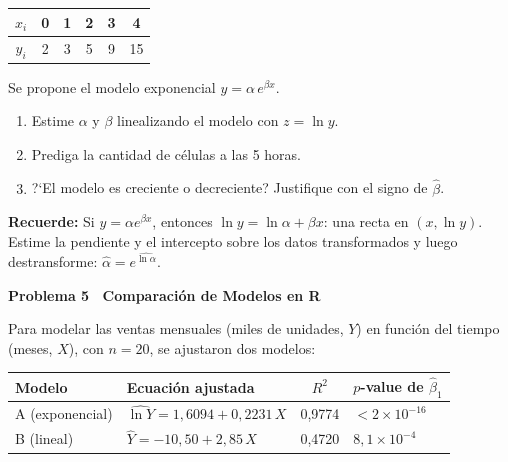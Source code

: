 \documentclass[10pt,letterpaper]{article}
\newcommand{\seccion}[1]{%
  \vspace{2pt}%
  \begin{tcolorbox}[enhanced,colback=white,colframe=black,arc=0pt,boxrule=0pt,
    leftrule=2pt,left=6pt,right=6pt,top=1pt,bottom=1pt]
    {\normalsize\bfseries\sffamily #1}
  \end{tcolorbox}%
  \vspace{1pt}%
}
\newcommand{\reglacaja}[1]{%
  \begin{tcolorbox}[enhanced,colback=white,colframe=black,arc=0pt,boxrule=0.5pt,
    left=6pt,right=6pt,top=2pt,bottom=2pt,breakable]
  \small\sffamily #1
  \end{tcolorbox}%
}
\begin{document}
\vspace{4pt}
\begin{center}
\small\sffamily
\begin{tabular}{|c|c|c|c|c|c|}
\hline
$x_i$ & 0 & 1 & 2 & 3 & 4 \\
\hline
$y_i$ & 2 & 3 & 5 & 9 & 15 \\
\hline
\end{tabular}
\end{center}
\vspace{4pt}

Se propone el modelo exponencial $y=\alpha\,e^{\beta x}$.

\begin{enumerate}[leftmargin=1.2cm, label=\textbf{\alph*)}, itemsep=2pt, topsep=2pt]
  \item Estime $\alpha$ y $\beta$ linealizando el modelo con $z=\ln y$.
  \item Prediga la cantidad de c\'elulas a las 5 horas.
  \item ?`El modelo es creciente o decreciente? Justifique con el signo de $\hat{\beta}$.
\end{enumerate}

\reglacaja{%
\textbf{Recuerde:} Si $y=\alpha e^{\beta x}$, entonces $\ln y = \ln\alpha + \beta x$: una recta en $(x,\ln y)$. Estime la pendiente y el intercepto sobre los datos transformados y luego destransforme: $\hat{\alpha}=e^{\widehat{\ln\alpha}}$.%
}

\seccion{Problema 5 \textendash\ Comparaci\'on de Modelos en \textsf{R}}

\noindent\sffamily\small Para modelar las ventas mensuales (miles de unidades, $Y$) en funci\'on del tiempo (meses, $X$), con $n=20$, se ajustaron dos modelos:

\vspace{2pt}
\begin{center}
\small\sffamily
\begin{tabular}{|l|l|c|l|}
\hline
\textbf{Modelo} & \textbf{Ecuaci\'on ajustada} & $R^2$ & $p$-value de $\hat{\beta}_1$ \\
\hline
A (exponencial) & $\widehat{\ln Y}=1{,}6094+0{,}2231\,X$ & 0{,}9774 & $<2\times10^{-16}$ \\
\hline
B (lineal) & $\hat{Y}=-10{,}50+2{,}85\,X$ & 0{,}4720 & $8{,}1\times10^{-4}$ \\
\hline
\end{tabular}
\end{center}
\vspace{2pt}
\end{document}
